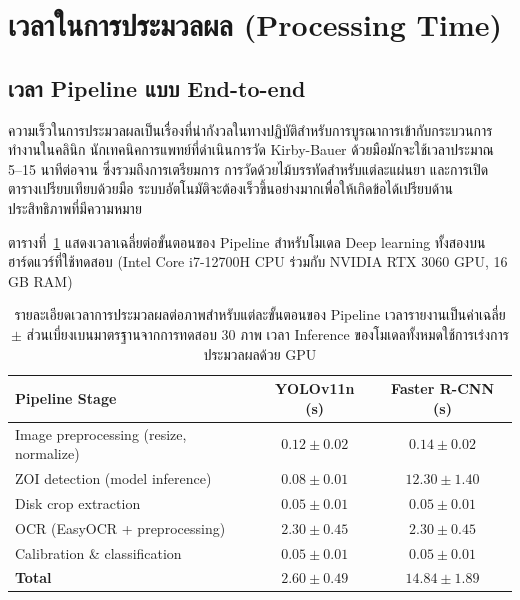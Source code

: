 \section{เวลาในการประมวลผล (Processing Time)}
\label{sec:processing_time}

\subsection{เวลา Pipeline แบบ End-to-end}

ความเร็วในการประมวลผลเป็นเรื่องที่น่ากังวลในทางปฏิบัติสำหรับการบูรณาการเข้ากับกระบวนการทำงานในคลินิก นักเทคนิคการแพทย์ที่ดำเนินการวัด Kirby-Bauer ด้วยมือมักจะใช้เวลาประมาณ 5--15 นาทีต่อจาน \cite{humphries2018} ซึ่งรวมถึงการเตรียมการ การวัดด้วยไม้บรรทัดสำหรับแต่ละแผ่นยา และการเปิดตารางเปรียบเทียบด้วยมือ
ระบบอัตโนมัติจะต้องเร็วขึ้นอย่างมากเพื่อให้เกิดข้อได้เปรียบด้านประสิทธิภาพที่มีความหมาย

ตารางที่~\ref{tab:processing_time} แสดงเวลาเฉลี่ยต่อขั้นตอนของ Pipeline สำหรับโมเดล Deep learning ทั้งสองบนฮาร์ดแวร์ที่ใช้ทดสอบ (Intel Core i7-12700H CPU ร่วมกับ NVIDIA RTX 3060 GPU, 16 GB RAM)

\begin{table}[H]
  \centering
  \caption{รายละเอียดเวลาการประมวลผลต่อภาพสำหรับแต่ละขั้นตอนของ Pipeline
           เวลารายงานเป็นค่าเฉลี่ย $\pm$ ส่วนเบี่ยงเบนมาตรฐานจากการทดสอบ 30 ภาพ
           เวลา Inference ของโมเดลทั้งหมดใช้การเร่งการประมวลผลด้วย GPU}
  \label{tab:processing_time}
  \begin{tabular}{lcc}
    \toprule
    \textbf{Pipeline Stage} &
    \textbf{YOLOv11n (s)} &
    \textbf{Faster R-CNN (s)} \\
    \midrule
    Image preprocessing (resize, normalize) & $0.12 \pm 0.02$ & $0.14 \pm 0.02$ \\
    ZOI detection (model inference)          & $0.08 \pm 0.01$ & $12.30 \pm 1.40$ \\
    Disk crop extraction                     & $0.05 \pm 0.01$ & $0.05 \pm 0.01$ \\
    OCR (EasyOCR + preprocessing)           & $2.30 \pm 0.45$ & $2.30 \pm 0.45$ \\
    Calibration \& classification            & $0.05 \pm 0.01$ & $0.05 \pm 0.01$ \\
    \midrule
    \textbf{Total}                           & $\mathbf{2.60 \pm 0.49}$ & $\mathbf{14.84 \pm 1.89}$ \\
    \bottomrule
  \end{tabular}
\end{table}

